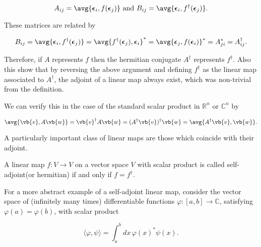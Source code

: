 \documentclass[a4paper,12pt]{report}
\begin{document}
\begin{equation}
    A_{ij}= \avg{\boldsymbol{\epsilon }_{i}, f(\boldsymbol{\epsilon }_{j}  )  } \text { and } B_{ij}=\avg{\boldsymbol{\epsilon }_{i}, f^{\dagger} (\boldsymbol{\epsilon }_{j}  )  }.    
\end{equation}

These matrices are related by

\begin{equation}
    B_{ij} = \avg{\boldsymbol{\epsilon  }_{i} , f^{\dagger} (\boldsymbol{\epsilon }_{j}  )} = \avg{f^{\dagger} (\boldsymbol{\epsilon }_{j}  ), \boldsymbol{\epsilon }_{i}  }^{*} = \avg{\boldsymbol{\epsilon }_{j}, f(\boldsymbol{\epsilon } _{i} )  }^{*} = A_{ji}^{*} = A^{\dagger} _{ij}.         
\end{equation}

Therefore, if \(A\) represents \(f\) then the hermitian conjugate \(A^{\dagger} \) represents \(f^{\dagger} \). Also this show that by reversing the above argument and defining \(f^{\dagger} \) as the linear map associated to \(A^{\dagger} \), the adjoint of a linear map always exist, which was non-trivial from the definition.

We can verify this in the case of the standard scalar product in \(\mathbb{R}^{n} \text { or } \mathbb{C}^{n}  \) by

\begin{equation}
    \avg{\vb{v} ,A\vb{w} } = \vb{v} ^{\dagger} A \vb{w}  = (A^{\dagger} \vb{v} )^{\dagger} \vb{w} = \avg{A^{\dagger} \vb{v} ,\vb{w} }.   
\end{equation}

A particularly important class of linear maps are those which coincide with their adjoint. 

\begin{definition}
A linear map \(f:V \rightarrow V\) on a vector space \(V\) with scalar product is called self-adjoint(or hermitian) if and only if \(f= f^{\dagger} \).


\end{definition}

For a more abstract example of a self-adjoint linear map, consider the vector space of (infinitely many times) differentiable functions $\varphi : [a, b] \to \mathbb{C}$, satisfying $\varphi(a) = \varphi(b)$, with scalar product

\begin{equation}
\langle \varphi, \psi \rangle = \int_a^b dx \, \varphi(x)^* \psi(x).
\end{equation}
\end{document}
